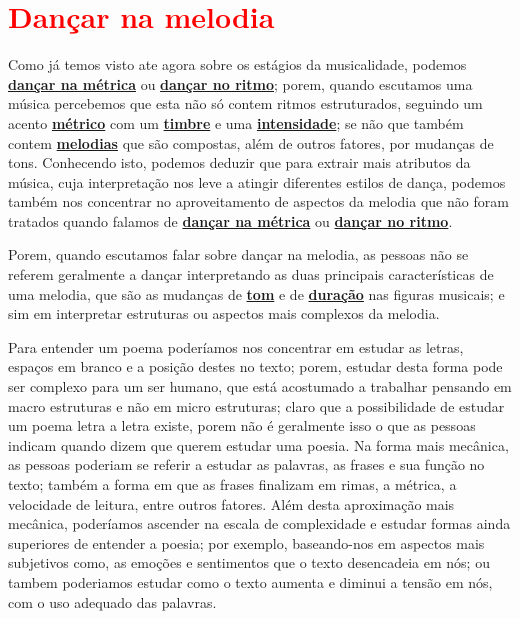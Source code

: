 

\newpage
\section{\textcolor{red}{Dançar na melodia}}
\label{subsec:dancamelodia}

Como já temos visto ate agora sobre os estágios da musicalidade, 
podemos \hyperref[subsec:dancametrica]{\textbf{dançar na métrica}}  ou \hyperref[subsec:dancaritmo]{\textbf{dançar no ritmo}};
porem, quando escutamos uma música percebemos que esta não só contem ritmos estruturados, 
seguindo um acento \hyperref[def:Metrica]{\textbf{métrico}} com um \hyperref[sec:pos:timbre]{\textbf{timbre}} 
e uma \hyperref[sec:pos:Intensidade]{\textbf{intensidade}};
se não que também contem \hyperref[sec:pos:Melodia]{\textbf{melodias}} que são compostas, além de outros fatores, 
por mudanças de tons.
Conhecendo isto, 
podemos deduzir que para extrair mais atributos da música,
cuja interpretação nos leve a atingir diferentes estilos de dança,
podemos também nos concentrar no aproveitamento de aspectos da melodia que não foram tratados 
quando falamos de \hyperref[subsec:dancametrica]{\textbf{dançar na métrica}} ou 
\hyperref[subsec:dancaritmo]{\textbf{dançar no ritmo}}.


Porem, quando escutamos falar sobre dançar na melodia,
as pessoas não se referem geralmente a dançar interpretando as duas principais características de uma melodia,
que são as mudanças de \hyperref[sec:pos:Altura]{\textbf{tom}} e de
\hyperref[sec:pos:Duracion]{\textbf{duração}} nas figuras musicais;
e sim em interpretar estruturas ou aspectos mais complexos da melodia.


\begin{example}
Para entender um poema poderíamos nos concentrar em estudar as letras, 
espaços em branco  e a posição destes no texto;
porem, estudar desta forma pode ser complexo para um ser humano,
que está acostumado a trabalhar pensando em macro estruturas e não em micro estruturas;
claro que a possibilidade de estudar um poema letra a letra existe,
porem não é geralmente isso o que as pessoas indicam quando dizem que querem estudar uma poesia.
Na forma mais mecânica, 
as pessoas poderiam se referir a estudar as palavras, as frases e sua função no texto;
também a forma em que as frases finalizam em rimas, a métrica,
a velocidade de leitura, entre outros fatores.
Além desta aproximação mais mecânica, 
poderíamos ascender na escala de complexidade e estudar formas ainda superiores de entender a poesia;
por exemplo, baseando-nos em aspectos mais subjetivos como, 
as emoções e sentimentos  que o texto desencadeia em nós;
ou tambem poderiamos estudar como o texto aumenta e diminui a tensão em nós,
 com o uso adequado das palavras.
\end{example}

